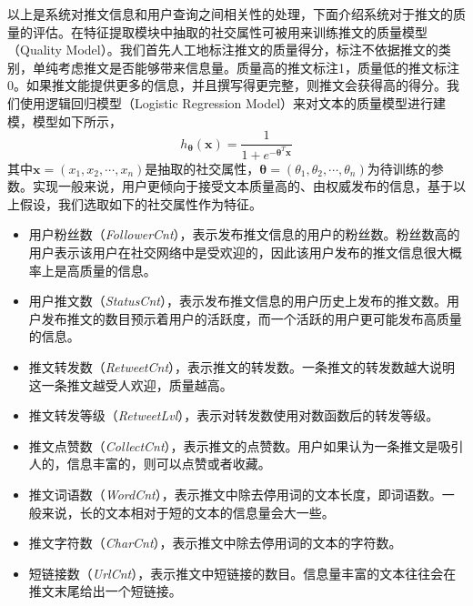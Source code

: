 以上是系统对推文信息和用户查询之间相关性的处理，下面介绍系统对于推文的质量的评估。在特征提取模块中抽取的社交属性可被用来训练推文的质量模型（Quality Model）。我们首先人工地标注推文的质量得分，标注不依据推文的类别，单纯考虑推文是否能够带来信息量。质量高的推文标注1，质量低的推文标注0。如果推文能提供更多的信息，并且撰写得更完整，则推文会获得高的得分。我们使用逻辑回归模型（Logistic Regression Model）来对文本的质量模型进行建模，模型如下所示，
\begin{equation}
\label{eq:lr}
  h_ {\bm{\theta}} \left(\mathbf{x}\right) = \frac{1}{1 + e^{-{{\bm{\theta}}^T}\mathbf{x}}}
\end{equation}
其中$\mathbf{x}=\left({x_1},{x_2},\cdots,{x_n}\right)$是抽取的社交属性，$\bm{\theta}=\left({\theta _1},{\theta _2},\cdots,{\theta _n}\right)$为待训练的参数。实现一般来说，用户更倾向于接受文本质量高的、由权威发布的信息，基于以上假设，我们选取如下的社交属性作为特征。
\begin{itemize}
  \item 用户粉丝数（\textit{FollowerCnt}），表示发布推文信息的用户的粉丝数。粉丝数高的用户表示该用户在社交网络中是受欢迎的，因此该用户发布的推文信息很大概率上是高质量的信息。
  \item 用户推文数（\textit{StatusCnt}），表示发布推文信息的用户历史上发布的推文数。用户发布推文的数目预示着用户的活跃度，而一个活跃的用户更可能发布高质量的信息。
  \item 推文转发数（\textit{RetweetCnt}），表示推文的转发数。一条推文的转发数越大说明这一条推文越受人欢迎，质量越高。
  \item 推文转发等级（\textit{RetweetLvl}），表示对转发数使用对数函数后的转发等级。
  \item 推文点赞数（\textit{CollectCnt}），表示推文的点赞数。用户如果认为一条推文是吸引人的，信息丰富的，则可以点赞或者收藏。
  \item 推文词语数（\textit{WordCnt}），表示推文中除去停用词的文本长度，即词语数。一般来说，长的文本相对于短的文本的信息量会大一些。
  \item 推文字符数（\textit{CharCnt}），表示推文中除去停用词的文本的字符数。
  \item 短链接数（\textit{UrlCnt}），表示推文中短链接的数目。信息量丰富的文本往往会在推文末尾给出一个短链接。
\end{itemize}

